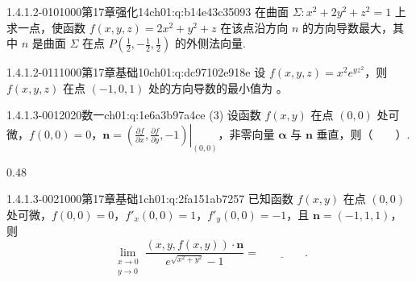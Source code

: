 \begin{q}{1.4.1.2-010}{1000第17章强化14}{ch01:q:b14e43c35093}
在曲面 $\Sigma:x^2+2y^2+z^2=1$ 上求一点，使函数 $f(x,y,z)=2x^2+y^2+z$ 在该点沿方向 $n$ 的方向导数最大，其中 $n$ 是曲面 $\Sigma$ 在点 $P\left(\frac{1}{2},-\frac{1}{2},\frac{1}{2}\right)$ 的外侧法向量.
\end{q}

\begin{q}{1.4.1.2-011}{1000第17章基础10}{ch01:q:dc97102e918e}
设 $f(x,y,z)=x^2 e^{y z^2}$，则 $f(x,y,z)$ 在点 $(-1,0,1)$ 处的方向导数的最小值为 \underline{\hspace{4em}}。
\end{q}

\par\addvspace{2.4ex}\noindent
\begin{minipage}{\linewidth}

\begin{q}{1.4.1.3-001}{2020数一}{ch01:q:1e6a3b97a4ce}
(3) 设函数 $f(x,y)$ 在点 $(0,0)$ 处可微，$f(0,0)=0$，$\mathbf{n}=\left.\left(\frac{\partial f}{\partial x},\frac{\partial f}{\partial y},-1\right)\right|_{(0,0)}$，非零向量 $\boldsymbol{\alpha}$ 与 $\mathbf{n}$ 垂直，则（　　）.
\begin{opts}{0.48}
\hfill{}\\[0.3ex]
\hfill{}
\end{opts}
\end{q}
\end{minipage}


\begin{q}{1.4.1.3-002}{1000第17章基础1}{ch01:q:2fa151ab7257}
已知函数 $f(x,y)$ 在点 $(0,0)$ 处可微，$f(0,0)=0$，$f'_x(0,0)=1$，$f'_y(0,0)=-1$，且 $\boldsymbol{n}=(-1,1,1)$，则
\[\lim_{\substack{x\to 0\\ y\to 0}} \frac{(x,y,f(x,y))\cdot \boldsymbol{n}}{e^{\sqrt{x^2+y^2}}-1} = \underline{\hspace{4em}} .\]
\end{q}

